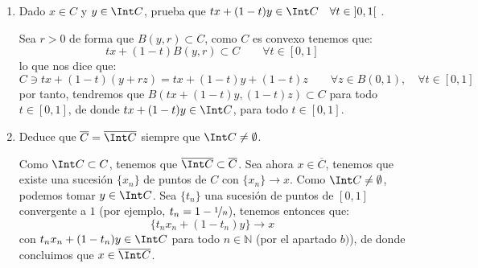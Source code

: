 \begin{ejercicio}
\begin{enumerate}[label=\alph*)]
\begin{itemize}
\begin{description}
                            \begin{equation*}
                                \alpha = tx + (1-t)y + rz
                            \end{equation*}
                            para cierto $z\in B(0,1)$. De esta forma, tendremos que:
                            \begin{equation*}
                                \alpha = tx + (1-t)y + r(tz + (1-t)z) = t(x+rz) + (1-t)(y + rz)
                            \end{equation*}
                            con $tz,(1-t)z\in B(0,1)$, por lo que:
                            \begin{equation*}
                                t(x+rz) \in tB(x,r), \qquad (1-t)(y+rz) \in (1-t)B(y,r)
                            \end{equation*}
                    \end{description}
            \end{itemize}
        \item Dado $x\in C$ y $y\in \Int C$, prueba que $tx+(1-t)y\in \Int C\quad \forall t\in \left]0,1\right[$ .

            Sea $r>0$ de forma que $B(y,r)\subset C$, como $C$ es convexo tenemos que:
            \begin{equation*}
                tx+(1-t)B(y,r)\subset C \qquad \forall t\in [0,1]
            \end{equation*}
            lo que nos dice que:
            \begin{equation*}
                C\ni tx + (1-t)(y+rz) = tx + (1-t)y + (1-t)z \qquad \forall z\in B(0,1), \quad \forall t\in [0,1]
            \end{equation*}
            por tanto, tendremos que $B(tx+(1-t)y,(1-t)z)\subset C$ para todo $t\in [0,1]$, de donde $tx+(1-t)y\in \Int C$, para todo $t\in [0,1]$.
        \item Deduce que $\overline{C} = \overline{\Int C}$ siempre que $\Int C\neq \emptyset $.

            Como $\Int C\subset C$, tenemos que $\overline{\Int C}\subset \overline{C}$. Sea ahora $x\in \overline{C}$, tenemos que existe una sucesión $\{x_n\}$ de puntos de $C$ con $\{x_n\}\to x$. Como $\Int C \neq \emptyset $, podemos tomar $y\in \Int C$. Sea $\{t_n\}$ una sucesión de puntos de $[0,1]$ convergente a $1$ (por ejemplo, $t_n = 1-\nicefrac{1}{n}$), tenemos entonces que:
            \begin{equation*}
                \{t_n x_n + (1-t_n)y\} \to x
            \end{equation*}
            con $t_nx_n + (1-t_n)y\in \Int C$ para todo $n\in \mathbb{N}$ (por el apartado $b)$), de donde concluimos que $x\in \overline{\Int C}$.
    \end{enumerate}
\end{ejercicio}


